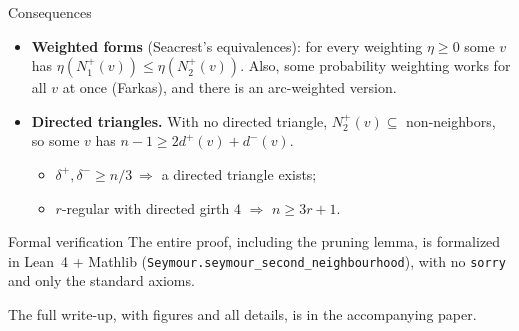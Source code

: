 \documentclass[aspectratio=169,11pt]{beamer}
\newcommand{\Nout}{N^+_1}
\newcommand{\Ntwo}{N^+_2}
\begin{document}
\begin{frame}{Consequences}
\begin{itemize}
\item \textbf{Weighted forms} (Seacrest's equivalences): for every weighting
$\eta\ge0$ some $v$ has $\eta(\Nout(v))\le\eta(\Ntwo(v))$. Also, some probability
weighting works for all $v$ at once (Farkas), and there is an arc-weighted
version.
\item \textbf{Directed triangles.} With no directed triangle,
$\Ntwo(v)\subseteq$ non-neighbors, so some $v$ has $n-1\ge2d^+(v)+d^-(v)$.
\begin{itemize}
\item $\delta^+,\delta^-\ge n/3\ \Rightarrow$ a directed triangle exists;
\item $r$-regular with directed girth $4$ $\Rightarrow$ $n\ge3r+1$.
\end{itemize}
\end{itemize}
\vfill
\begin{block}{Formal verification}
The entire proof, including the pruning lemma, is formalized in Lean~4 + Mathlib
(\texttt{Seymour.seymour\_second\_neighbourhood}), with no \texttt{sorry} and only
the standard axioms.
\end{block}
\centering\small The full write-up, with figures and all details, is in the accompanying paper.
\end{frame}
\end{document}
